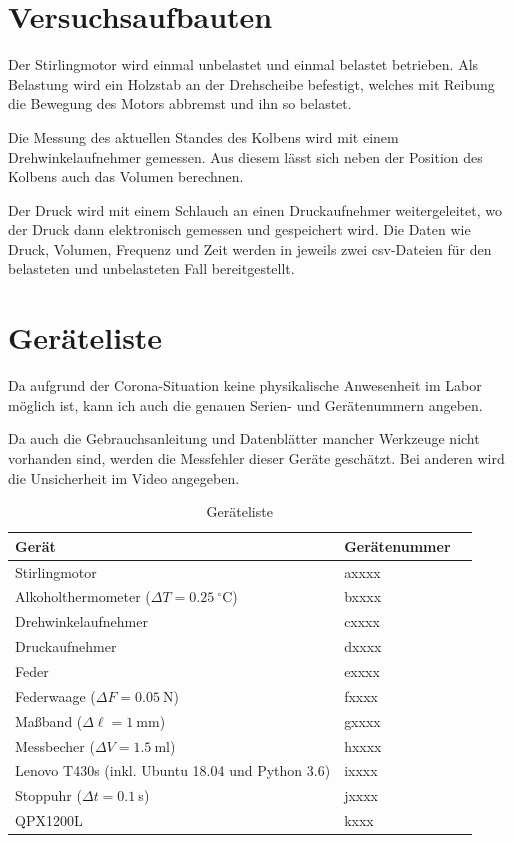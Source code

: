 \documentclass{article}
\begin{document}
\section{Versuchsaufbauten}

Der Stirlingmotor wird einmal unbelastet und einmal belastet betrieben. Als Belastung wird ein Holzstab an der Drehscheibe befestigt, welches mit Reibung die Bewegung des Motors abbremst und ihn so belastet.

Die Messung des aktuellen Standes des Kolbens wird mit einem Drehwinkelaufnehmer gemessen. Aus diesem lässt sich neben der Position des Kolbens auch das Volumen berechnen.

Der Druck wird mit einem Schlauch an einen Druckaufnehmer weitergeleitet, wo der Druck dann elektronisch gemessen und gespeichert wird. Die Daten wie Druck, Volumen, Frequenz und Zeit werden in jeweils zwei csv-Dateien für den belasteten und unbelasteten Fall bereitgestellt.

\newpage

\section{Geräteliste}


Da aufgrund der Corona-Situation keine physikalische Anwesenheit im Labor möglich ist, kann ich auch die genauen Serien- und Gerätenummern angeben.

Da auch die Gebrauchsanleitung und Datenblätter mancher Werkzeuge nicht vorhanden sind, werden die Messfehler dieser Geräte geschätzt. Bei anderen wird die Unsicherheit im Video angegeben.


\begin{table}[h]
\caption{Geräteliste}

\begin{tabular}{lll}
Gerät  & Gerätenummer \\
\hline
Stirlingmotor & axxxx \\
Alkoholthermometer ($\Delta T = 0.25~^\circ$C) & bxxxx \\
Drehwinkelaufnehmer & cxxxx \\
Druckaufnehmer & dxxxx \\
Feder & exxxx \\
Federwaage ($\Delta F = 0.05~$N) & fxxxx \\
Maßband ($\Delta \ell = 1~$mm) & gxxxx\\
Messbecher ($\Delta V = 1.5~$ml) & hxxxx\\
Lenovo T430s (inkl. Ubuntu 18.04 und Python 3.6) & ixxxx\\
Stoppuhr ($\Delta t = 0.1~$s) & jxxxx \\
QPX1200L & kxxx
\end{tabular}
\end{table}
\end{document}
